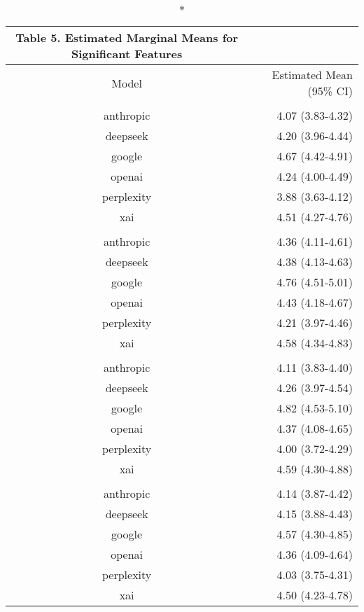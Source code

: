 \documentclass[
  11pt]{report}
\begin{document}
\begingroup
\fontsize{12.0pt}{14.4pt}\selectfont
\begin{longtable*}{cr}
\caption*{
{\large Table 5. Estimated Marginal Means for Significant Features}
} \\ 
\toprule
Model & Estimated Mean (95\% CI) \\ 
\midrule\addlinespace[2.5pt]
 \\[2.5pt] 
\midrule\addlinespace[2.5pt]
anthropic & 4.07 (3.83-4.32) \\ 
deepseek & 4.20 (3.96-4.44) \\ 
google & 4.67 (4.42-4.91) \\ 
openai & 4.24 (4.00-4.49) \\ 
perplexity & 3.88 (3.63-4.12) \\ 
xai & 4.51 (4.27-4.76) \\ 
\midrule\addlinespace[2.5pt]
 \\[2.5pt] 
\midrule\addlinespace[2.5pt]
anthropic & 4.36 (4.11-4.61) \\ 
deepseek & 4.38 (4.13-4.63) \\ 
google & 4.76 (4.51-5.01) \\ 
openai & 4.43 (4.18-4.67) \\ 
perplexity & 4.21 (3.97-4.46) \\ 
xai & 4.58 (4.34-4.83) \\ 
\midrule\addlinespace[2.5pt]
 \\[2.5pt] 
\midrule\addlinespace[2.5pt]
anthropic & 4.11 (3.83-4.40) \\ 
deepseek & 4.26 (3.97-4.54) \\ 
google & 4.82 (4.53-5.10) \\ 
openai & 4.37 (4.08-4.65) \\ 
perplexity & 4.00 (3.72-4.29) \\ 
xai & 4.59 (4.30-4.88) \\ 
\midrule\addlinespace[2.5pt]
 \\[2.5pt] 
\midrule\addlinespace[2.5pt]
anthropic & 4.14 (3.87-4.42) \\ 
deepseek & 4.15 (3.88-4.43) \\ 
google & 4.57 (4.30-4.85) \\ 
openai & 4.36 (4.09-4.64) \\ 
perplexity & 4.03 (3.75-4.31) \\ 
xai & 4.50 (4.23-4.78) \\ 

\end{longtable*}
\end{document}
